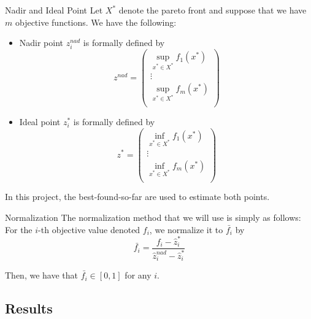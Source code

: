 \begin{frame}{Nadir and Ideal Point}
    Let \(X^*\) denote the pareto front and suppose that we have \(m\) objective functions. We have the following:
    \begin{itemize}
        \item Nadir point \(z_i^{nad}\) is formally defined by
            \[
                z^{nad} = \begin{pmatrix}
                    \sup_{x^* \in X^*} f_1(x^*) \\
                    \vdots \\
                    \sup_{x^* \in X^*} f_m(x^*) \\
                \end{pmatrix}
            \]
        \item Ideal point \(z_i^*\) is formally defined by
            \[
                z^{*} = \begin{pmatrix}
                    \inf_{x^* \in X^*} f_1(x^*) \\
                    \vdots \\
                    \inf_{x^* \in X^*} f_m(x^*) \\
                \end{pmatrix}
            \]
    \end{itemize}
    In this project, the best-found-so-far are used to estimate both points.
\end{frame}

\begin{frame}{Normalization}
    The normalization method that we will use is simply as follows: For the \(i\)-th objective value denoted \(f_i\), we normalize it to \(\bar{f_i}\) by
    \[
        \bar{f_i} = \frac{f_i - \hat{z}^*_i}{\hat{z}_i^{nad} - \hat{z}_i^*}
    \]

    Then, we have that \(\bar{f_i} \in [0, 1]\) for any \(i\).
\end{frame}

\subsection{Results}


